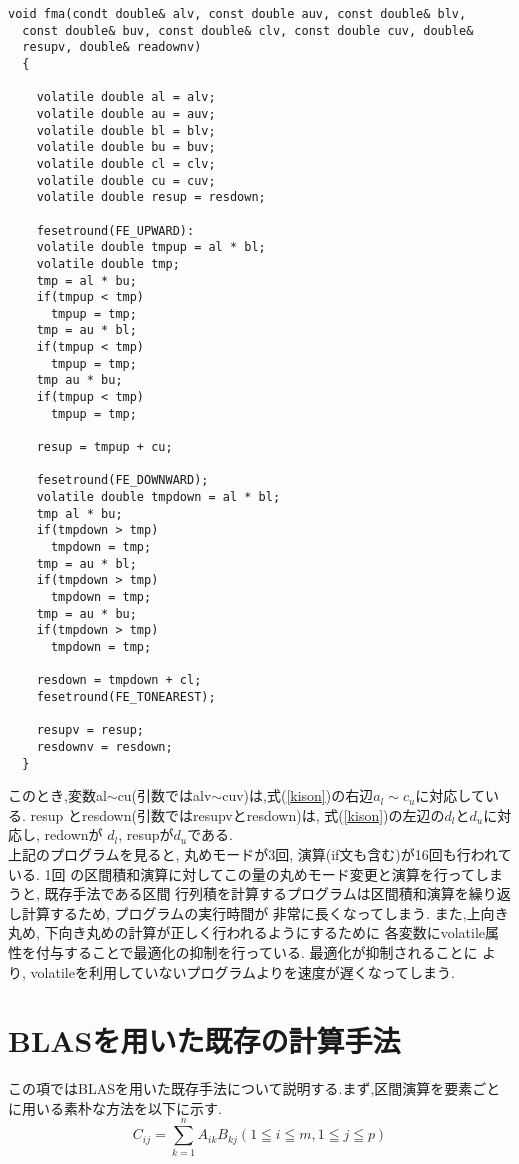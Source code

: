 \documentclass[11pt,a4paper]{jsreport}
\theoremstyle{definition}
\begin{document}
\begin{lstlisting}[caption = 上端下端型の区間積和演算のプログラム]
  void fma(condt double& alv, const double auv, const double& blv,
  const double& buv, const double& clv, const double cuv, double&
  resupv, double& readownv)
  {

    volatile double al = alv;
    volatile double au = auv;
    volatile double bl = blv;
    volatile double bu = buv;
    volatile double cl = clv;
    volatile double cu = cuv;
    volatile double resup = resdown;

    fesetround(FE_UPWARD):
    volatile double tmpup = al * bl;
    volatile double tmp;
    tmp = al * bu;
    if(tmpup < tmp)
      tmpup = tmp;
    tmp = au * bl;
    if(tmpup < tmp)
      tmpup = tmp;
    tmp au * bu;
    if(tmpup < tmp)
      tmpup = tmp;

    resup = tmpup + cu;

    fesetround(FE_DOWNWARD);
    volatile double tmpdown = al * bl;
    tmp al * bu;
    if(tmpdown > tmp)
      tmpdown = tmp;
    tmp = au * bl;
    if(tmpdown > tmp)
      tmpdown = tmp;
    tmp = au * bu;
    if(tmpdown > tmp)
      tmpdown = tmp;

    resdown = tmpdown + cl;
    fesetround(FE_TONEAREST);

    resupv = resup;
    resdownv = resdown;
  }
\end{lstlisting}
  このとき,変数al$\sim$cu(引数ではalv$\sim$cuv)は,式(\ref{kison})の右辺$a_l \sim c_u$に対応している. resup
とresdown(引数ではresupvとresdown)は, 式(\ref{kison})の左辺の$d_l$と$d_u$に対応し, redownが
$d_l$, resupが$d_u$である. \\
\indent  上記のプログラムを見ると, 丸めモードが3回, 演算(if文も含む)が16回も行われている. 1回
の区間積和演算に対してこの量の丸めモード変更と演算を行ってしまうと, 既存手法である区間
行列積を計算するプログラムは区間積和演算を繰り返し計算するため, プログラムの実行時間が
非常に長くなってしまう. また,上向き丸め, 下向き丸めの計算が正しく行われるようにするために
各変数にvolatile属性を付与することで最適化の抑制を行っている. 最適化が抑制されることに
より, volatileを利用していないプログラムよりを速度が遅くなってしまう.
\section{BLASを用いた既存の計算手法}
	この項ではBLASを用いた既存手法について説明する.まず,区間演算を要素ごとに用いる素朴な方法を以下に示す.
	\begin{equation}
	C_{ij} = \sum_{k=1}^n A_{ik}B_{kj} (1 \leqq i \leqq m,1 \leqq j \leqq p)
	\end{equation}
	
\end{document}
